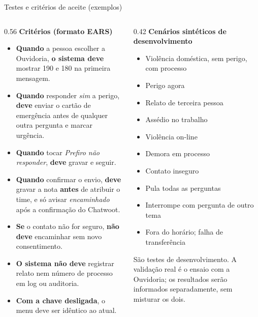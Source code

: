 \documentclass[aspectratio=169,10pt]{beamer}
\newcommand{\code}[1]{\texttt{\detokenize{#1}}}
\begin{document}
\begin{frame}{Testes e critérios de aceite (exemplos)}
\begin{columns}[T]
\begin{column}{0.56\textwidth}
\scriptsize\textbf{Critérios (formato EARS)}
\begin{itemize}\setlength\itemsep{2pt}
  \item \textbf{Quando} a pessoa escolher a Ouvidoria, \textbf{o sistema deve} mostrar 190 e 180 na primeira mensagem.
  \item \textbf{Quando} responder \emph{sim} a perigo, \textbf{deve} enviar o cartão de emergência antes de qualquer outra pergunta e marcar urgência.
  \item \textbf{Quando} tocar \emph{Prefiro não responder}, \textbf{deve} gravar \code{nao_informado} e seguir.
  \item \textbf{Quando} confirmar o envio, \textbf{deve} gravar a nota \textbf{antes} de atribuir o time, e só avisar \emph{encaminhado} após a confirmação do Chatwoot.
  \item \textbf{Se} o contato não for seguro, \textbf{não deve} encaminhar sem novo consentimento.
  \item \textbf{O sistema não deve} registrar relato nem número de processo em log ou auditoria.
  \item \textbf{Com a chave desligada}, o menu deve ser idêntico ao atual.
\end{itemize}
\end{column}
\begin{column}{0.42\textwidth}
\scriptsize\textbf{Cenários sintéticos de desenvolvimento}
\begin{itemize}\setlength\itemsep{2pt}
  \item Violência doméstica, sem perigo, com processo
  \item Perigo agora
  \item Relato de terceira pessoa
  \item Assédio no trabalho
  \item Violência on-line
  \item Demora em processo
  \item Contato inseguro
  \item Pula todas as perguntas
  \item Interrompe com pergunta de outro tema
  \item Fora do horário; falha de transferência
\end{itemize}
{\tiny\textcolor{cinza}{São testes de desenvolvimento. A validação real é o ensaio com a Ouvidoria; os resultados serão informados separadamente, sem misturar os dois.}}
\end{column}
\end{columns}
\end{frame}
\end{document}
